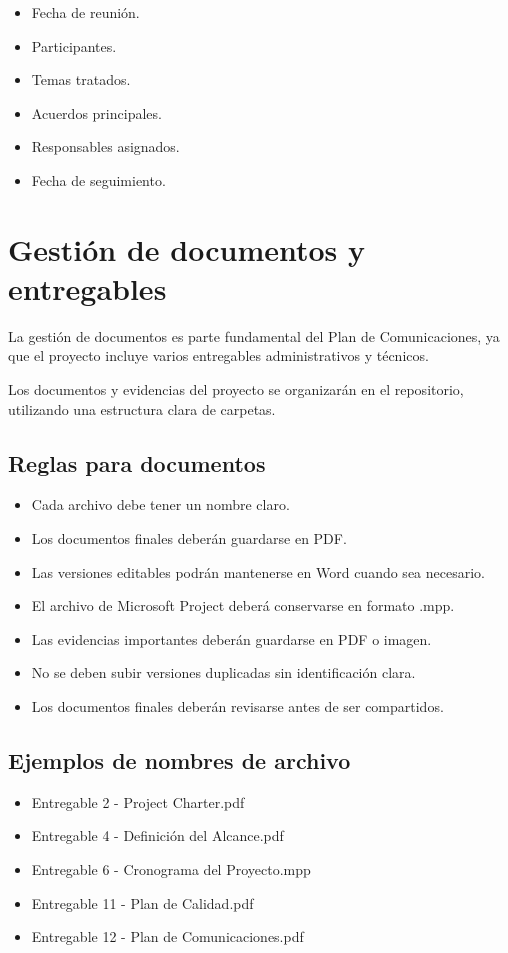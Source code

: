 \documentclass[11pt,spanish]{article}
\begin{document}
\begin{itemize}
    \item Fecha de reunión.
    \item Participantes.
    \item Temas tratados.
    \item Acuerdos principales.
    \item Responsables asignados.
    \item Fecha de seguimiento.
\end{itemize}

\section{Gestión de documentos y entregables}

La gestión de documentos es parte fundamental del Plan de Comunicaciones, ya que el proyecto incluye varios entregables administrativos y técnicos.

Los documentos y evidencias del proyecto se organizarán en el repositorio, utilizando una estructura clara de carpetas.

\subsection{Reglas para documentos}

\begin{itemize}
    \item Cada archivo debe tener un nombre claro.
    \item Los documentos finales deberán guardarse en PDF.
    \item Las versiones editables podrán mantenerse en Word cuando sea necesario.
    \item El archivo de Microsoft Project deberá conservarse en formato .mpp.
    \item Las evidencias importantes deberán guardarse en PDF o imagen.
    \item No se deben subir versiones duplicadas sin identificación clara.
    \item Los documentos finales deberán revisarse antes de ser compartidos.
\end{itemize}

\subsection{Ejemplos de nombres de archivo}

\begin{itemize}
    \item Entregable 2 - Project Charter.pdf
    \item Entregable 4 - Definición del Alcance.pdf
    \item Entregable 6 - Cronograma del Proyecto.mpp
    \item Entregable 11 - Plan de Calidad.pdf
    \item Entregable 12 - Plan de Comunicaciones.pdf
\end{itemize}
\end{document}
